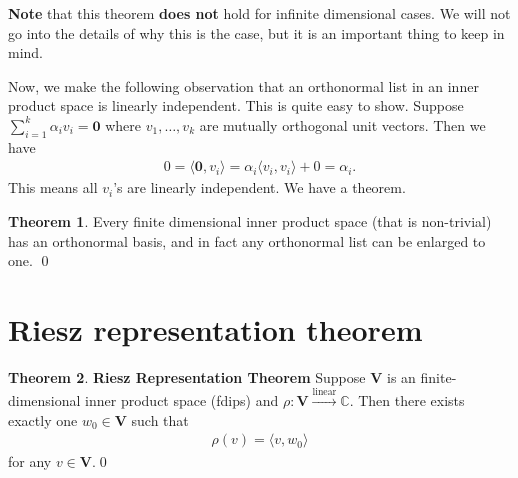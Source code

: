 \documentclass{book}
\theoremstyle{definition}
\newtheorem{thm}{Theorem}[section]
\newcommand{\C}{\mathbb{C}}
\newcommand{\V}{\mathbf{V}}
\newcommand{\lin}{\overset{\text{linear}}{\longrightarrow}}
\newcommand{\la}{\langle}
\newcommand{\ra}{\rangle}
\begin{document}
	\textbf{Note} that this theorem \textbf{does not} hold for infinite dimensional cases. We will not go into the details of why this is the case, but it is an important thing to keep in mind. 
	
	
	Now, we make the following observation that an orthonormal list in an inner product space is linearly independent. This is quite easy to show. Suppose $\sum^k_{i=1}\alpha_iv_i = \mathbf{0}$ where $v_1,\dots, v_k$ are mutually orthogonal unit vectors. Then we have
	\begin{align*}
	0 = \la \mathbf{0}, v_i \ra = \alpha_i \la v_i ,v_i \ra +0 = \alpha_i.
	\end{align*} 
	This means all $v_i$'s are linearly independent. We have a theorem.
	
	\begin{thm}
		Every finite dimensional inner product space (that is non-trivial) has an orthonormal basis, and in fact any orthonormal list can be enlarged to one. \qed
	\end{thm}
 
\section{Riesz representation theorem}

\begin{thm}\textbf{Riesz Representation Theorem}
	Suppose $\V$ is an finite-dimensional inner product space (fdips) and $\rho : \V \lin \C$. Then there exists exactly one $w_0 \in \V$ such that 
	\begin{align*}
	\rho(v) = \la  v, w_0\ra
	\end{align*}
	for any $v\in \V$.\qed	
\end{thm}
\end{document}
